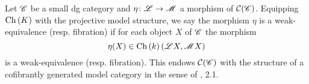 \documentclass[dissertation.tex]{subfiles}
\begin{document}
\begin{defn}
  Let $\mathscr{C}$ be a small dg category and $\eta \colon \mathscr{L} \to \mathscr{M}$ a morphism of $\mathcal{C}(\mathscr{C})$.
  Equipping $\operatorname{Ch}\left(K\right)$ with the projective model structure, we say the morphism $\eta$ is a weak-equivalence (resp. fibration) if for each object $X$ of $\mathscr{C}$ the morphism
  $$\eta(X) \in \operatorname{Ch}\left(k\right)(\mathscr{L}X, \mathscr{M}X)$$
  is a weak-equivalence (resp. fibration).
  This endows $\mathcal{C}(\mathscr{C})$ with the structure of a cofibrantly generated model category in the sense of \cite{HoveyMC}, 2.1.
\end{defn}
\end{document}
